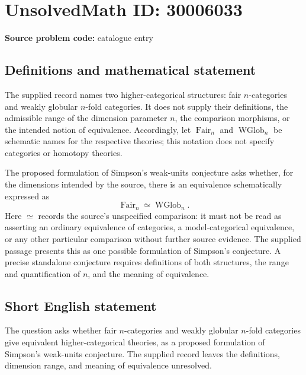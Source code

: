 \documentclass[11pt]{article}
\begin{document}
\section*{UnsolvedMath ID: 30006033}
\textbf{Source problem code:} catalogue entry
\subsection{Definitions and mathematical statement}
The supplied record names two higher-categorical structures: fair \(n\)-categories and weakly globular \(n\)-fold categories. It does not supply their definitions, the admissible range of the dimension parameter \(n\), the comparison morphisms, or the intended notion of equivalence. Accordingly, let \(\operatorname{Fair}_n\) and \(\operatorname{WGlob}_n\) be schematic names for the respective theories; this notation does not specify categories or homotopy theories.

The proposed formulation of Simpson's weak-units conjecture asks whether, for the dimensions intended by the source, there is an equivalence schematically expressed as
\[
\operatorname{Fair}_n \simeq \operatorname{WGlob}_n.
\]
Here \(\simeq\) records the source's unspecified comparison: it must not be read as asserting an ordinary equivalence of categories, a model-categorical equivalence, or any other particular comparison without further source evidence. The supplied passage presents this as one possible formulation of Simpson's conjecture. A precise standalone conjecture requires definitions of both structures, the range and quantification of \(n\), and the meaning of equivalence.
\subsection{Short English statement}
The question asks whether fair \(n\)-categories and weakly globular \(n\)-fold categories give equivalent higher-categorical theories, as a proposed formulation of Simpson's weak-units conjecture. The supplied record leaves the definitions, dimension range, and meaning of equivalence unresolved.
\end{document}
